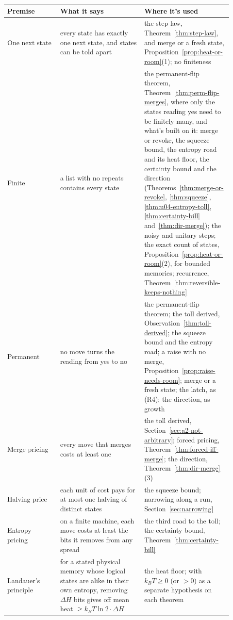 \documentclass[11pt,twoside]{article}
\theoremstyle{thielethm}
\theoremstyle{thieledef}
\theoremstyle{thieledef}
\theoremstyle{thieledef}
\theoremstyle{thielethm}
\theoremstyle{thieleobs}
\theoremstyle{thielethm}
\begin{document}
\begingroup\small
\begin{longtable}{@{}>{\raggedright\arraybackslash}p{0.22\linewidth}>{\raggedright\arraybackslash}p{0.35\linewidth}>{\raggedright\arraybackslash}p{0.35\linewidth}@{}}
\toprule
\textbf{Premise} & \textbf{What it says} & \textbf{Where it's used} \\
\midrule
\endhead
\bottomrule
\endlastfoot
One next state & every state has exactly one next state, and states can be told apart & the step law, Theorem~\ref{thm:step-law}, and merge or a fresh state, Proposition~\ref{prop:heat-or-room}(1); no finiteness \\
Finite & a list with no repeats contains every state & the permanent-flip theorem, Theorem~\ref{thm:perm-flip-merges}, where only the states reading yes need to be finitely many, and what's built on it: merge or revoke, the squeeze bound, the entropy road and its heat floor, the certainty bound and the direction (Theorems~\ref{thm:merge-or-revoke}, \ref{thm:squeeze}, \ref{thm:u04-entropy-toll}, \ref{thm:certainty-bill} and~\ref{thm:dir-merge}); the noisy and unitary steps; the exact count of states, Proposition~\ref{prop:heat-or-room}(2), for bounded memories; recurrence, Theorem~\ref{thm:reversible-keeps-nothing} \\
Permanent & no move turns the reading from yes to no & the permanent-flip theorem; the toll derived, Observation~\ref{thm:toll-derived}; the squeeze bound and the entropy road; a raise with no merge, Proposition~\ref{prop:raise-needs-room}; merge or a fresh state; the latch, as (R4); the direction, as growth \\
Merge pricing & every move that merges costs at least one & the toll derived, Section~\ref{sec:a2-not-arbitrary}; forced pricing, Theorem~\ref{thm:forced-iff-merge}; the direction, Theorem~\ref{thm:dir-merge}(3) \\
Halving price & each unit of cost pays for at most one halving of distinct states & the squeeze bound; narrowing along a run, Section~\ref{sec:narrowing} \\
Entropy pricing & on a finite machine, each move costs at least the bits it removes from any spread & the third road to the toll; the certainty bound, Theorem~\ref{thm:certainty-bill} \\
Landauer's principle & for a stated physical memory whose logical states are alike in their own entropy, removing $\Delta H$ bits gives off mean heat $\ge k_B T \ln 2 \cdot \Delta H$ & the heat floor; with $k_B T \ge 0$ (or $> 0$) as a separate hypothesis on each theorem \\

\end{longtable}
\end{document}
